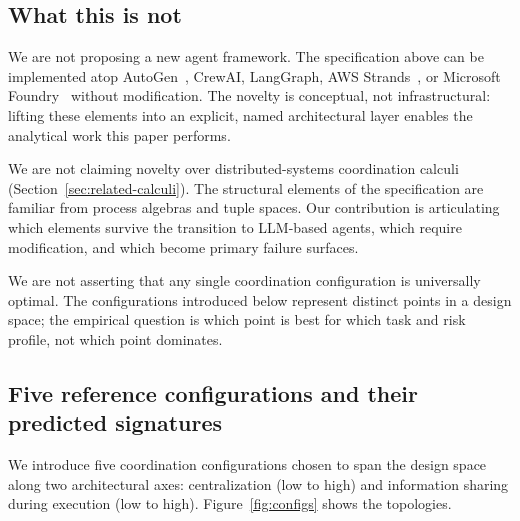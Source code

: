 \documentclass[11pt]{article}
\begin{document}
\subsection{What this is not}
\label{sec:layer-not}

We are not proposing a new agent framework. The specification above can be implemented atop AutoGen~\citep{wu2023autogen}, CrewAI, LangGraph, AWS Strands~\citep{strands2025}, or Microsoft Foundry~\citep{foundry2026} without modification. The novelty is conceptual, not infrastructural: lifting these elements into an explicit, named architectural layer enables the analytical work this paper performs.

We are not claiming novelty over distributed-systems coordination calculi (Section~\ref{sec:related-calculi}). The structural elements of the specification are familiar from process algebras and tuple spaces. Our contribution is articulating which elements survive the transition to LLM-based agents, which require modification, and which become primary failure surfaces.

We are not asserting that any single coordination configuration is universally optimal. The configurations introduced below represent distinct points in a design space; the empirical question is which point is best for which task and risk profile, not which point dominates.

\subsection{Five reference configurations and their predicted signatures}
\label{sec:layer-configs}

We introduce five coordination configurations chosen to span the design space along two architectural axes: centralization (low to high) and information sharing during execution (low to high). Figure~\ref{fig:configs} shows the topologies.
\end{document}
